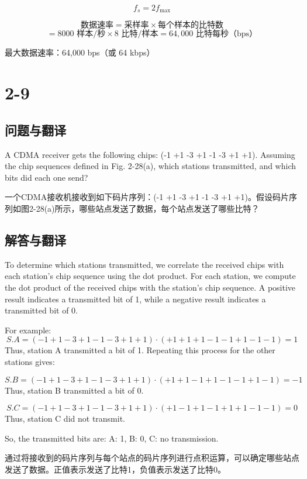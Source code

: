 \[
f_s = 2f_{\text{max}}
\]

\[
\text{数据速率} = \text{采样率} \times \text{每个样本的比特数}
\]
\[
= 8000 \text{ 样本/秒} \times 8 \text{ 比特/样本} = 64,000 \text{ 比特每秒（bps）}
\]

最大数据速率：64,000 bps（或 64 kbps）

\section{2-9}

\subsection{问题与翻译}

A CDMA receiver gets the following chips: (-1 +1 -3 +1 -1 -3 +1 +1). Assuming the chip sequences defined in Fig. 2-28(a), which stations transmitted, and which bits did each one send?

一个CDMA接收机接收到如下码片序列：(-1 +1 -3 +1 -1 -3 +1 +1)。假设码片序列如图2-28(a)所示，哪些站点发送了数据，每个站点发送了哪些比特？

\subsection{解答与翻译}

To determine which stations transmitted, we correlate the received chips with each station's chip sequence using the dot product. For each station, we compute the dot product of the received chips with the station's chip sequence. A positive result indicates a transmitted bit of 1, while a negative result indicates a transmitted bit of 0.

For example:
\[
S.A = (-1 +1 -3 +1 -1 -3 +1 +1) \cdot (+1 +1 +1 -1 -1 +1 -1 -1) = 1
\]
Thus, station A transmitted a bit of 1. Repeating this process for the other stations gives:

\[
S.B = (-1 +1 -3 +1 -1 -3 +1 +1) \cdot (+1 +1 -1 +1 -1 -1 +1 -1) = -1
\]
Thus, station B transmitted a bit of 0.

\[
S.C = (-1 +1 -3 +1 -1 -3 +1 +1) \cdot (+1 -1 +1 -1 +1 +1 -1 -1) = 0
\]
Thus, station C did not transmit.

So, the transmitted bits are: A: 1, B: 0, C: no transmission.

\vspace{10pt}

通过将接收到的码片序列与每个站点的码片序列进行点积运算，可以确定哪些站点发送了数据。正值表示发送了比特1，负值表示发送了比特0。

